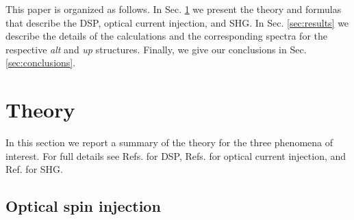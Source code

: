 \documentclass[pss]{wiley2sp} %
\begin{document}
This paper is organized as follows. In Sec. \ref{sec:theory} we present the
theory and formulas that describe the DSP, optical current injection, and SHG.
In Sec. \ref{sec:results} we describe the details of the calculations and the
corresponding spectra for the respective \emph{alt} and \emph{up} structures.
Finally, we give our conclusions in Sec. \ref{sec:conclusions}.


\section{Theory}\label{sec:theory}

In this section we report a summary of the theory for the three phenomena of
interest. For full details see Refs. \cite{nastosPRB07,mendozaPRB12} for DSP,
Refs. \cite{cabellosPRB11,sipePRB00} for optical current injection, and Ref.
\cite{andersonPRB15} for SHG.


\subsection{Optical spin injection}\label{sec:theory-DSP}
\end{document}
